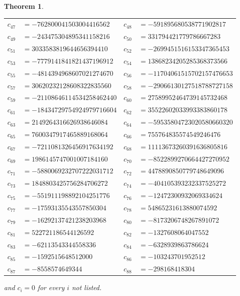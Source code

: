 \documentclass[11pt,a4paper]{article}
\theoremstyle{plain}
\newtheorem{theorem}{Theorem}
\theoremstyle{definition}
\begin{document}
\begin{theorem}
\begin{center}
\begin{tabular}{r@{\,}l@{\qquad}r@{\,}l}
$c_{47}$ & $=-762800041503004416562$ & $c_{48}$ & $=-591895680538771902817$ \\
$c_{49}$ & $=-243475304895341158216$ & $c_{50}$ & $=331794421779786667283$ \\
$c_{51}$ & $=3033583819644656394410$ & $c_{52}$ & $=-2699451516153347365453$ \\
$c_{53}$ & $=-7779141841821437196912$ & $c_{54}$ & $=13868234205285368373566$ \\
$c_{55}$ & $=-4814394968607021274670$ & $c_{56}$ & $=-11704061515702157476653$ \\
$c_{57}$ & $=30620232128608322835560$ & $c_{58}$ & $=-29066130127518788727158$ \\
$c_{59}$ & $=-21108646114534258462440$ & $c_{60}$ & $=27589952464739145732468$ \\
$c_{61}$ & $=-18434729754924979716604$ & $c_{62}$ & $=35522602033993383860178$ \\
$c_{63}$ & $=2149264316626938646084$ & $c_{64}$ & $=-59535804723020580660320$ \\
$c_{65}$ & $=7600347917465889168064$ & $c_{66}$ & $=755764835574549246476$ \\
$c_{67}$ & $=-7211081326456917634192$ & $c_{68}$ & $=11113673260391636805816$ \\
$c_{69}$ & $=1986145747001007184160$ & $c_{70}$ & $=-8522899270664427270952$ \\
$c_{71}$ & $=-5880069232707222031712$ & $c_{72}$ & $=4478890850779748649096$ \\
$c_{73}$ & $=1848803425756284706272$ & $c_{74}$ & $=-404105393232337525272$ \\
$c_{75}$ & $=-551911198892104251776$ & $c_{76}$ & $=-12472300932069334624$ \\
$c_{77}$ & $=-17593135543557850304$ & $c_{78}$ & $=54865231613880074592$ \\
$c_{79}$ & $=-16292137421238203968$ & $c_{80}$ & $=-8173206748267891072$ \\
$c_{81}$ & $=522721186544126592$ & $c_{82}$ & $=-1327608064047552$ \\
$c_{83}$ & $=-62113543344558336$ & $c_{84}$ & $=-6328939863786624$ \\
$c_{85}$ & $=-1592515648512000$ & $c_{86}$ & $=-103243701952512$ \\
$c_{87}$ & $=-8558574649344$ & $c_{88}$ & $=-298168418304$ \\
\end{tabular}
\end{center}
and $c_i=0$ for every $i$ not listed.
\end{theorem}
\end{document}
